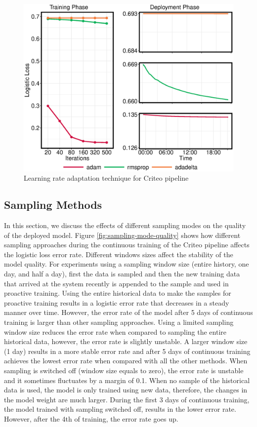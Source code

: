 \begin{figure}[h!]
\includegraphics[width=\columnwidth]{../images/experiment-results/criteo-learning-rate-experiment.eps}
\caption{Learning rate adaptation technique for Criteo pipeline}
\label{fig:criteo-learning-rate}
\end{figure}

\subsection{Sampling Methods}
In this section, we discuss the effects of different sampling modes on the quality of the deployed model.
Figure \ref{fig:sampling-mode-quality} shows how different sampling approaches during the continuous training of the Criteo pipeline affects the logistic loss error rate.
Different windows sizes affect the stability of the model quality.
For experiments using a sampling window size (entire history, one day, and half a day), first the data is sampled and then the new training data that arrived at the system recently is appended to the sample and used in proactive training.
Using the entire historical data to make the samples for proactive training results in a logistic error rate that decreases in a steady manner over time.
However, the error rate of the model after 5 days of continuous training is larger than other sampling approaches.
Using a limited sampling window size reduces the error rate when compared to sampling the entire historical data, however, the error rate is slightly unstable.
A larger window size (1 day) results in a more stable error rate and after 5 days of continuous training achieves the lowest error rate when compared with all the other methods.
When sampling is switched off (window size equals to zero), the error rate is unstable and it sometimes fluctuates by a margin of 0.1.
When no sample of the historical data is used, the model is only trained using new data, therefore, the changes in the model weight are much larger.
During the first 3 days of continuous training, the model trained with sampling switched off, results in the lower error rate.
However, after the 4th of training, the error rate goes up.

